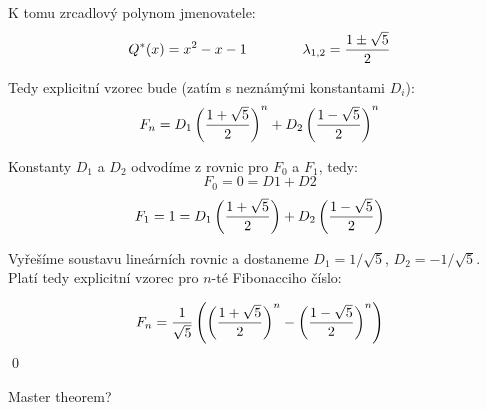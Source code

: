 K tomu zrcadlový polynom jmenovatele:
$$Q^*(x) = x^2-x-1\qquad\qquad\lambda_{1,2} = {1\pm\sqrt 5\over 2}$$

Tedy explicitní vzorec bude (zatím s neznámými konstantami $D_i$):
$$F_n = D_1\left({1+\sqrt 5\over 2}\right)^n + D_2\left({1-\sqrt 5\over 2}\right)^n$$

Konstanty $D_1$ a $D_2$ odvodíme z rovnic pro $F_0$ a $F_1$, tedy:
$$F_0 = 0 = D1 + D2$$
$$F_1 = 1 = D_1\left({1+\sqrt 5\over 2}\right) + D_2\left({1-\sqrt 5\over 2}\right)$$

Vyřešíme soustavu lineárních rovnic a dostaneme $D_1 = 1/\sqrt 5$, $D_2 = -1/\sqrt 5$. Platí tedy explicitní vzorec pro $n$-té Fibonacciho číslo:

$$F_n = {1\over\sqrt 5}\left(\left({1+\sqrt 5\over 2}\right)^n - \left({1-\sqrt 5\over 2}\right)^n\right)$$
\qed

\todo Master theorem?
